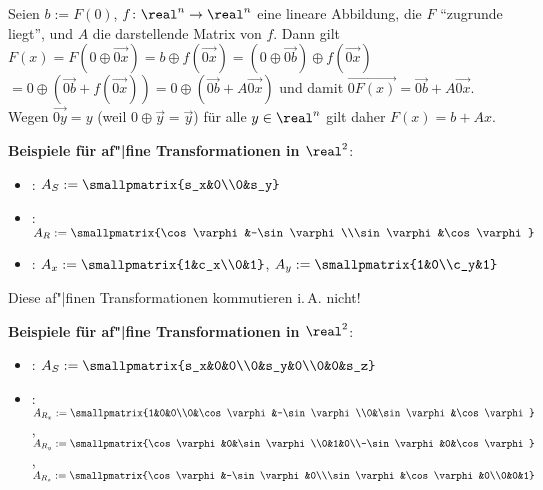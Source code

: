 \begin{Beweis}
    Seien $b := F(0)$, $f\colon \real^n \to \real^n$ eine lineare Abbildung,
    die $F$ "`zugrunde liegt"', und $A$ die darstellende Matrix von $f$.
    Dann gilt
    $F(x)
    = F(0 \oplus \vec{0x})
    = b \oplus f(\vec{0x})
    = (0 \oplus \vec{0b}) \oplus f(\vec{0x})$\\
    $= 0 \oplus (\vec{0b} + f(\vec{0x}))
    = 0 \oplus (\vec{0b} + A\vec{0x})$ und damit
    $\vec{0F(x)} = \vec{0b} + A\vec{0x}$.
    Wegen $\vec{0y} = y$ (weil $0 \oplus \vec{y} = \vec{y}$) für alle $y \in \real^n$ gilt daher
    $F(x) = b + Ax$.
\end{Beweis}

\linie

\textbf{Beispiele für af"|fine Transformationen in $\real^2$}:
\begin{itemize}
    \item
    :
    $A_S := \smallpmatrix{s_x&0\\0&s_y}$
    
    \item
    :
    $A_R := \smallpmatrix{\cos\varphi&-\sin\varphi\\\sin\varphi&\cos\varphi}$
    
    \item
    :
    $A_x := \smallpmatrix{1&c_x\\0&1}$,
    $A_y := \smallpmatrix{1&0\\c_y&1}$
\end{itemize}
Diese af"|finen Transformationen kommutieren i.\,A. nicht!

\linie

\textbf{Beispiele für af"|fine Transformationen in $\real^2$}:
\begin{itemize}
    \item
    :
    $A_S := \smallpmatrix{s_x&0&0\\0&s_y&0\\0&0&s_z}$
    
    \item
    :
    $A_{R_x} := \smallpmatrix{1&0&0\\0&\cos\varphi&-\sin\varphi\\0&\sin\varphi&\cos\varphi}$,
    $A_{R_y} := \smallpmatrix{\cos\varphi&0&\sin\varphi\\0&1&0\\-\sin\varphi&0&\cos\varphi}$,
    $A_{R_z} := \smallpmatrix{\cos\varphi&-\sin\varphi&0\\\sin\varphi&\cos\varphi&0\\0&0&1}$
\end{itemize}


